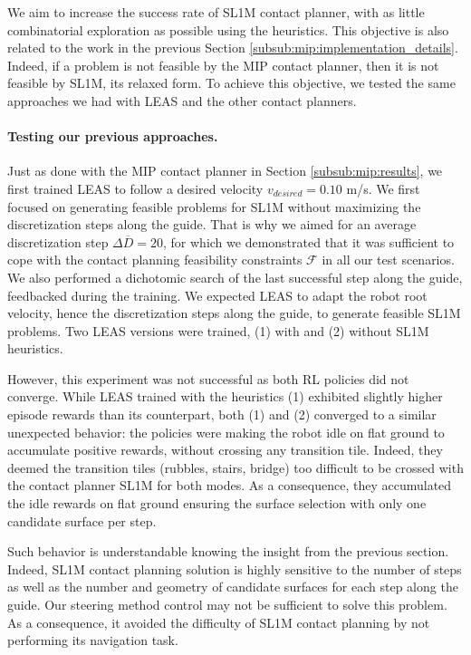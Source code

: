 We aim to increase the success rate of SL1M contact planner, with as little combinatorial exploration as possible using the heuristics.
This objective is also related to the work in the previous Section \ref{subsub:mip:implementation_details}. 
Indeed, if a problem is not feasible by the MIP contact planner, then it is not feasible by SL1M, its relaxed form.
To achieve this objective, we tested the same approaches we had with LEAS and the other contact planners.

\paragraph{Testing our previous approaches.}
Just as done with the MIP contact planner in Section \ref{subsub:mip:results}, 
we first trained LEAS to follow a desired velocity $v_{desired}=0.10$ m/s.
We first focused on generating feasible problems for SL1M without maximizing the discretization steps along the guide.
That is why we aimed for an average discretization step $\Delta \overline{D}=20$, for which we demonstrated that it was sufficient to cope with the contact planning feasibility constraints $\mathcal{F}$ in all our test scenarios.
We also performed a dichotomic search of the last successful step along the guide, feedbacked during the training.
We expected LEAS to adapt the robot root velocity, hence the discretization steps along the guide, to generate feasible SL1M problems.
Two LEAS versions were trained, (1) with and (2) without SL1M heuristics. 

However, this experiment was not successful as both RL policies did not converge.
While LEAS trained with the heuristics (1) exhibited slightly higher episode rewards than its counterpart, both (1) and (2) converged to a similar unexpected behavior:
the policies were making the robot idle on flat ground to accumulate positive rewards, without crossing any transition tile. 
Indeed, they deemed the transition tiles (rubbles, stairs, bridge) too difficult to be crossed with the contact planner SL1M for both modes.
As a consequence, they accumulated the idle rewards on flat ground ensuring the surface selection with only one candidate surface per step.

Such behavior is understandable knowing the insight from the previous section. Indeed, SL1M contact planning solution is highly sensitive to the number of steps as well as the number and geometry of candidate surfaces for each step along the guide.
Our steering method control may not be sufficient to solve this problem. As a consequence, it avoided the difficulty of SL1M contact planning by not performing its navigation task.



